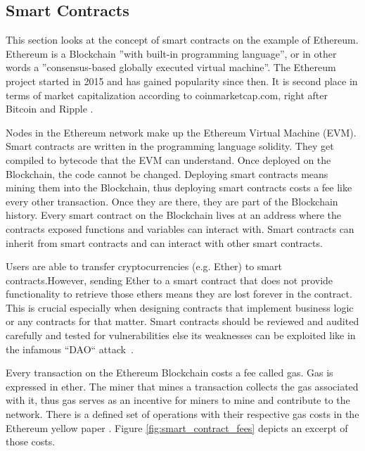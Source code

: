 \subsection{Smart Contracts}
\label{subsec:02_smart_contracts}

This section looks at the concept of smart contracts on the example of Ethereum.
Ethereum is a Blockchain ''with built-in programming language'', or in other words a ''consensus-based globally executed virtual machine''.
The Ethereum project started in 2015 and has gained popularity since then. It is second place in terms of market capitalization according to coinmarketcap.com, right after Bitcoin and Ripple \cite{coinmarketcap}.

Nodes in the Ethereum network make up the Ethereum Virtual Machine (EVM). Smart contracts are written in the programming language solidity. They get compiled to bytecode that the EVM can understand.
Once deployed on the Blockchain, the code cannot be changed. Deploying smart contracts means mining them into the Blockchain, thus deploying smart contracts costs a fee like every other transaction. Once they are there, they are part of the Blockchain history. Every smart contract on the Blockchain lives at an address where the contracts exposed functions and variables can interact with. Smart contracts can inherit from smart contracts and can interact with other smart contracts.

Users are able to transfer cryptocurrencies (e.g. Ether) to smart contracts.However, sending Ether to a smart contract that does not provide functionality to retrieve those ethers means they are lost forever in the contract. This is crucial especially when designing contracts that implement business logic or any contracts for that matter. Smart contracts should be reviewed and audited carefully and tested for vulnerabilities else its weaknesses can be exploited like in the infamous ``DAO`` attack~\cite{DoaAttack}.

Every transaction on the Ethereum Blockchain costs a fee called gas. Gas is expressed in ether. The miner that mines a transaction collects the gas associated with it, thus gas serves as an incentive for miners to mine and contribute to the network. There is a defined set of operations with their respective gas costs in the Ethereum yellow paper \cite{ethereumyellowpaer}.
Figure \ref{fig:smart_contract_fees} depicts an excerpt of those costs.

